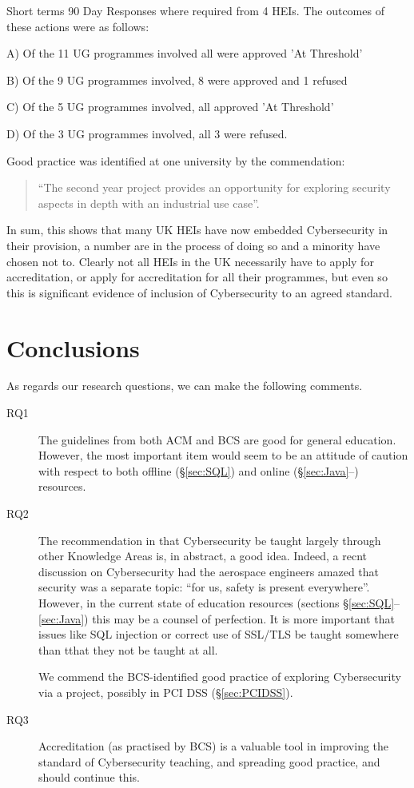 \documentclass[sigconf,anonymous]{acmart}
\begin{document}
Short terms 90 Day Responses where required from 4 HEIs. The outcomes of these actions were as follows:
                                                                        
A)	Of the 11 UG programmes involved all were approved 'At Threshold'

B)	Of the 9 UG programmes involved, 8 were approved and 1 refused

C)	Of the 5 UG programmes involved, all approved 'At Threshold'

D)	Of the 3 UG programmes involved, all 3 were refused.
 
Good practice was identified at one university by the commendation:
 \begin{quote}
``The second year project provides an opportunity for exploring security aspects in depth with an industrial use case''.
\end{quote}
In sum, this shows that many UK HEIs have now embedded Cybersecurity in their provision, a number are in the process of doing so and a minority have chosen not to. Clearly not all HEIs in the UK necessarily have to apply for accreditation, or apply for accreditation for all their programmes, but even so this is significant evidence of inclusion of Cybersecurity to an agreed standard.

\section{Conclusions}
As regards our research questions, we can make the following comments.
\begin{description}
\item[RQ1]The guidelines from both ACM and BCS are good for general education. However, the most important item would seem to be an attitude of caution with respect to both offline (\S\ref{sec:SQL}) and online (\S\ref{sec:Java}--) resources. 
\item[RQ2]The recommendation in \cite[p. 98]{ACM2013a} that Cybersecurity be taught largely through other Knowledge Areas is, in abstract, a good idea. Indeed, a recnt discussion on Cybersecurity had the aerospace engineers amazed that security was a separate topic: ``for us, safety is present everywhere''.  However, in the current state of education resources (sections \S\ref{sec:SQL}--\ref{sec:Java}) this may be a counsel of perfection.  It is more important that issues like SQL injection \cite{Drop2019} or correct use of SSL/TLS \cite{Chenetal2019a} be taught somewhere than tthat they not be taught at all.
\par
We commend the BCS-identified good practice of exploring Cybersecurity via a project, possibly in PCI DSS (\S\ref{sec:PCIDSS}).
\item[RQ3]Accreditation (as practised by BCS) is a valuable tool in improving the standard of Cybersecurity teaching, and spreading good practice, and should continue this.
\end{description}
\end{document}
